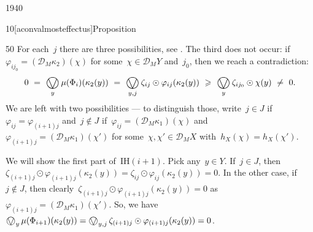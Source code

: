 \begin{parsec}{1940}
\begin{point}{10}[aconvalmosteffectus]{Proposition}
\begin{point}{50}
For each~$j$ there are three possibilities, see .
The third does not occur:
if~$\varphi_{ij_0} = (\mathcal{D}_M \kappa_2) (\chi)$
    for some~$\chi \in \mathcal{D}_M Y$ and~$j_0$,
    then we reach a contradiction:
\begin{equation*}
    0\ = \ 
    \bigovee_y \mu(\Phi_i)(\kappa_2(y))
    \ = \ \bigovee_{y,j} \zeta_{ij} \odot \varphi_{ij}(\kappa_2(y))
    \ \geq \ \bigovee_y \zeta_{ij_0} \odot \chi(y)\  \neq\  0.
\end{equation*}
We are left with two possibilities ---
    to distinguish those,
    write~$j \in J$ if~$\varphi_{ij} = \varphi_{(i+1)j}$
    and~$j \notin J$
    if~$\varphi_{ij} = (\mathcal{D}_M \kappa_1)(\chi)$
    and~$\varphi_{(i+1)j} = (\mathcal{D}_M \kappa_1)(\chi')$
    for some~$\chi,\chi' \in \mathcal{D}_M X$
    with~$h_X (\chi) = h_X(\chi')$.

    We will show the first part of~$\mathrm{IH}(i+1)$.
Pick any~$y \in Y$.
If~$j \in J$, then~$\zeta_{(i+1)j}\odot \varphi_{(i+1)j}(\kappa_2(y))
= \zeta_{ij} \odot \varphi_{ij}(\kappa_2(y)) = 0$.
In the other case, if~$j \notin J$,
then clearly~$\zeta_{(i+1)j}\odot \varphi_{(i+1)j}(\kappa_2(y)) = 0$
    as~$\varphi_{(i+1)j} = (\mathcal{D}_M \kappa_1)(\chi')$.
So, we have~$\bigovee_y \mu(\Phi_{i+1})(\kappa_2(y))
= \bigovee_{y,j} \zeta_{(i+1)j} \odot \varphi_{(i+1)j} (\kappa_2(y)) = 0 $.


\end{point}
\end{point}
\end{parsec}
